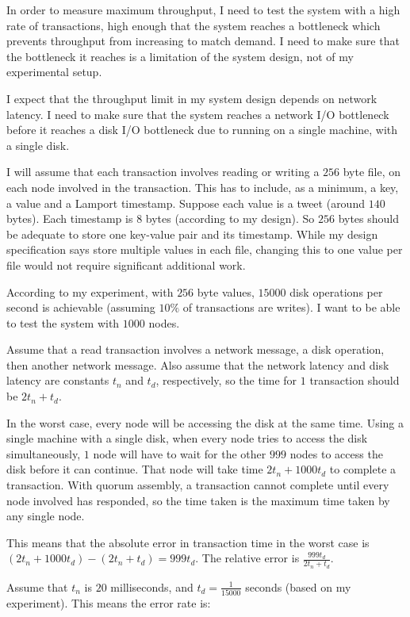 \documentclass[12pt,a4paper]{article}
\begin{document}
In order to measure maximum throughput, I need to test the system with a high rate of transactions, high enough that the system reaches a bottleneck which prevents throughput from increasing to match demand. I need to make sure that the bottleneck it reaches is a limitation of the system design, not of my experimental setup.

I expect that the throughput limit in my system design depends on network latency. I need to make sure that the system reaches a network I/O bottleneck before it reaches a disk I/O bottleneck due to running on a single machine, with a single disk.

I will assume that each transaction involves reading or writing a $256$ byte file, on each node involved in the transaction. This has to include, as a minimum, a key, a value and a Lamport timestamp. Suppose each value is a tweet (around $140$ bytes). Each timestamp is $8$ bytes (according to my design). So $256$ bytes should be adequate to store one key-value pair and its timestamp. While my design specification says store multiple values in each file, changing this to one value per file would not require significant additional work.

According to my experiment, with $256$ byte values, $15000$ disk operations per second is achievable (assuming $10\%$ of transactions are writes). I want to be able to test the system with $1000$ nodes.

Assume that a read transaction involves a network message, a disk operation, then another network message. Also assume that the network latency and disk latency are constants $t_n$ and $t_d$, respectively, so the time for $1$ transaction should be $2t_n + t_d$.

In the worst case, every node will be accessing the disk at the same time. Using a single machine with a single disk, when every node tries to access the disk simultaneously, $1$ node will have to wait for the other $999$ nodes to access the disk before it can continue. That node will take time $2t_n + 1000t_d$ to complete a transaction. With quorum assembly, a transaction cannot complete until every node involved has responded, so the time taken is the maximum time taken by any single node.

This means that the absolute error in transaction time in the worst case is $(2t_n + 1000t_d) - (2t_n + t_d) = 999t_d$. The relative error is $\frac{999t_d}{2t_n + t_d}$.

Assume that $t_n$ is $20$ milliseconds, and $t_d = \frac{1}{15000}$ seconds (based on my experiment). This means the error rate is:
\end{document}
